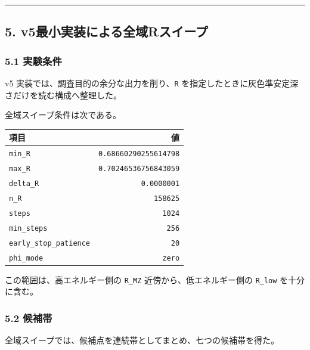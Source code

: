 \documentclass[
]{article}
\newcounter{none} %
\begin{document}
\begin{center}\rule{0.5\linewidth}{0.5pt}\end{center}

\subsection{5.
v5最小実装による全域Rスイープ}\label{v5ux6700ux5c0fux5b9fux88c5ux306bux3088ux308bux5168ux57dfrux30b9ux30a4ux30fcux30d7}

\subsubsection{5.1 実験条件}\label{ux5b9fux9a13ux6761ux4ef6}

v5 実装では、調査目的の余分な出力を削り、\texttt{R}
を指定したときに灰色準安定深さだけを読む構成へ整理した。

全域スイープ条件は次である。

{\def\LTcaptype{none} %
\begin{longtable}[]{@{}lr@{}}
\toprule\noalign{}
項目 & 値 \\
\midrule\noalign{}
\endhead
\bottomrule\noalign{}
\endlastfoot
\texttt{min\_R} & \texttt{0.68660290255614798} \\
\texttt{max\_R} & \texttt{0.70246536756843059} \\
\texttt{delta\_R} & \texttt{0.0000001} \\
\texttt{n\_R} & \texttt{158625} \\
\texttt{steps} & \texttt{1024} \\
\texttt{min\_steps} & \texttt{256} \\
\texttt{early\_stop\_patience} & \texttt{20} \\
\texttt{phi\_mode} & \texttt{zero} \\
\end{longtable}
}

この範囲は、高エネルギー側の \texttt{R\_MZ} 近傍から、低エネルギー側の
\texttt{R\_low} を十分に含む。

\subsubsection{5.2 候補帯}\label{ux5019ux88dcux5e2f}

全域スイープでは、候補点を連続帯としてまとめ、七つの候補帯を得た。
\end{document}
